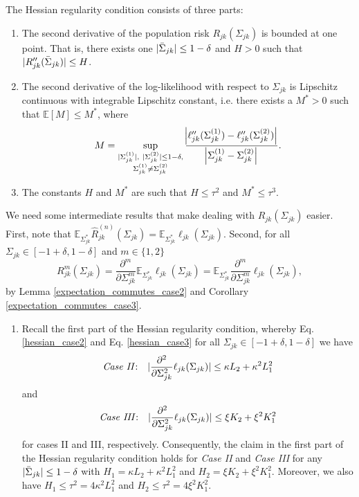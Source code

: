 \begin{condition}
    The Hessian regularity condition consists of three parts:
    \begin{enumerate}
        \item The second derivative of the population risk $R_{jk}(\Sigma_{jk})$ is bounded at one point. That is, there exists one $\lvert\Bar{\Sigma}_{jk}\rvert \leq 1- \delta$ and $H > 0$ such that $\lvert R_{jk}^{\prime\prime}(\Bar{\Sigma}_{jk})\rvert \leq H$.
        \item The second derivative of the log-likelihood with respect to $\Sigma_{jk}$ is Lipschitz continuous with integrable Lipschitz constant, i.e. there exists a $M^* > 0$ such that $\mathbb{E}[M] \leq M^*$, where
              \begin{equation*}
                  M = \sup_{\substack{\Abs{\Sigma_{jk}^{(1)}}, \  \Abs{\Sigma_{jk}^{(2)}} \leq 1- \delta, \\ \Sigma_{jk}^{(1)} \neq \Sigma_{jk}^{(2)}}} \frac{\abs{\ell_{jk}^{\prime\prime}(\Sigma_{jk}^{(1)}) - \ell_{jk}^{\prime\prime}(\Sigma_{jk}^{(2)})}}{\abs{\Sigma_{jk}^{(1)} - \Sigma_{jk}^{(2)}}}.
              \end{equation*}
        \item The constants $H$ and $M^*$ are such that $H \leq \tau^2$ and $M^*\leq \tau^3$.
    \end{enumerate}
    We need some intermediate results that make dealing with $R_{jk}(\Sigma_{jk})$ easier. First, note that $\mathbb{E}_{\Sigma_{jk}^*}\hat{R}_{jk}^{(n)}(\Sigma_{jk}) = \mathbb{E}_{\Sigma_{jk}^*}\ell_{jk}(\Sigma_{jk})$. Second, for all $\Sigma_{jk} \in [-1+\delta, 1-\delta]$ and $m \in \{1,2\}$
    \begin{equation*}
        R_{jk}^m(\Sigma_{jk}) = \frac{\partial^m}{\partial\Sigma_{jk}^m}\mathbb{E}_{\Sigma_{jk}^*}\ell_{jk}(\Sigma_{jk}) = \mathbb{E}_{\Sigma_{jk}^*}\frac{\partial^m}{\partial\Sigma_{jk}^m}\ell_{jk}(\Sigma_{jk}),
    \end{equation*}
    by Lemma \ref{expectation_commutes_case2} and Corollary \ref{expectation_commutes_case3}.

    \begin{enumerate}
        \item Recall the first part of the Hessian regularity condition, whereby Eq. \eqref{hessian_case2} and Eq. \eqref{hessian_case3} for all $\Sigma_{jk} \in [-1+\delta, 1-\delta]$ we have
              \[\text{\textit{Case II}:} \quad \lvert\frac{\partial^2}{\partial\Sigma_{jk}^2}\ell_{jk}(\Sigma_{jk})\rvert \leq \kappa L_2 + \kappa^2L_1^2\]
              and
              \[\text{\textit{Case III}:} \quad \lvert\frac{\partial^2}{\partial\Sigma_{jk}^2}\ell_{jk}(\Sigma_{jk})\rvert \leq \xi K_2 + \xi^2K_1^2\] for cases II and III, respectively. Consequently, the claim in the first part of the Hessian regularity condition holds for \textit{Case II} and \textit{Case III} for any $\lvert\Bar{\Sigma}_{jk}\rvert \leq 1-\delta$ with $H_{1} = \kappa L_2 + \kappa^2L_1^2$ and $H_{2} = \xi K_2 + \xi^2K_1^2$. Moreover, we also have $H_1 \leq \tau^2 = 4\kappa^2L_1^2$ and $H_2 \leq \tau^2 = 4\xi^2K_1^2$.


\end{enumerate}
\end{condition}
